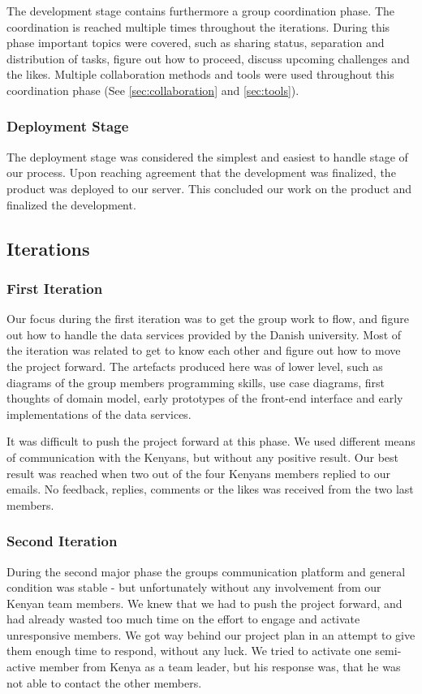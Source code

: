 The development stage contains furthermore a group coordination phase. The coordination is reached multiple times throughout the iterations. During this phase important topics were covered, such as sharing status, separation and distribution of tasks, figure out how to proceed, discuss upcoming challenges and the likes. Multiple collaboration methods and tools were used throughout this coordination phase (See \ref{sec:collaboration} and \ref{sec:tools}).

\subsubsection{Deployment Stage}
The deployment stage was considered the simplest and easiest to handle stage of our process. Upon reaching agreement that the development was finalized, the product was deployed to our server. This concluded our work on the product and finalized the development.

\subsection{Iterations} \label{subsec:iterations}
\subsubsection{First Iteration}
Our focus during the first iteration was to get the group work to flow, and figure out how to handle the data services provided by the Danish university. Most of the iteration was related to get to know each other and figure out how to move the project forward. The artefacts produced here was of lower level, such as diagrams of the group members programming skills, use case diagrams, first thoughts of domain model, early prototypes of the front-end interface and early implementations of the data services.

It was difficult to push the project forward at this phase. We used different means of communication with the Kenyans, but without any positive result. Our best result was reached when two out of the four Kenyans members replied to our emails. No feedback, replies, comments or the likes was received from the two last members.

\subsubsection{Second Iteration}
During the second major phase the groups communication platform and general condition was stable - but unfortunately without any involvement from our Kenyan team members. We knew that we had to push the project forward, and had already wasted too much time on the effort to engage and activate unresponsive members. We got way behind our project plan in an attempt to give them enough time to respond, without any luck. We tried to activate one semi-active member from Kenya as a team leader, but his response was, that he was not able to contact the other members.

